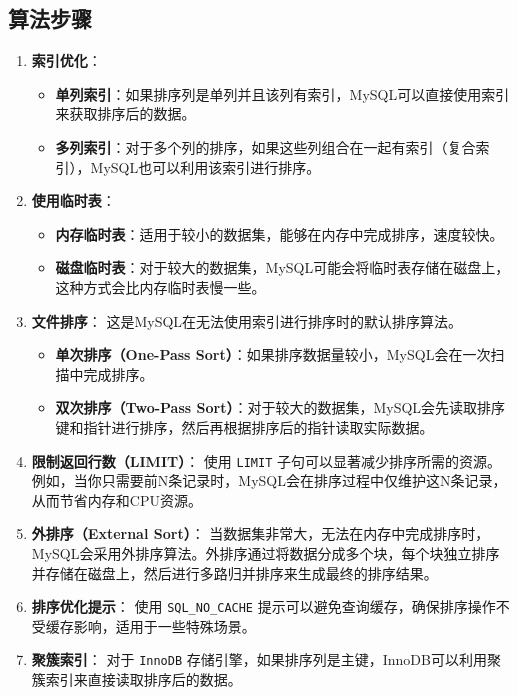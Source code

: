 \documentclass{report}
\begin{document}
\subsection{算法步骤}
\begin{enumerate}
    \item \textbf{索引优化}：
    \begin{itemize}
        \item \textbf{单列索引}：如果排序列是单列并且该列有索引，MySQL可以直接使用索引来获取排序后的数据。
        \item \textbf{多列索引}：对于多个列的排序，如果这些列组合在一起有索引（复合索引），MySQL也可以利用该索引进行排序。
    \end{itemize}
    
    \item \textbf{使用临时表}：
    \begin{itemize}
        \item \textbf{内存临时表}：适用于较小的数据集，能够在内存中完成排序，速度较快。
        \item \textbf{磁盘临时表}：对于较大的数据集，MySQL可能会将临时表存储在磁盘上，这种方式会比内存临时表慢一些。
    \end{itemize}
    
    \item \textbf{文件排序}：
    这是MySQL在无法使用索引进行排序时的默认排序算法。
    \begin{itemize}
        \item \textbf{单次排序（One-Pass Sort）}：如果排序数据量较小，MySQL会在一次扫描中完成排序。
        \item \textbf{双次排序（Two-Pass Sort）}：对于较大的数据集，MySQL会先读取排序键和指针进行排序，然后再根据排序后的指针读取实际数据。
    \end{itemize}
    
    \item \textbf{限制返回行数（LIMIT）}：
    使用 \verb|LIMIT| 子句可以显著减少排序所需的资源。例如，当你只需要前N条记录时，MySQL会在排序过程中仅维护这N条记录，从而节省内存和CPU资源。
    
    \item \textbf{外排序（External Sort）}：
    当数据集非常大，无法在内存中完成排序时，MySQL会采用外排序算法。外排序通过将数据分成多个块，每个块独立排序并存储在磁盘上，然后进行多路归并排序来生成最终的排序结果。
    
    \item \textbf{排序优化提示}：
    使用 \verb|SQL_NO_CACHE| 提示可以避免查询缓存，确保排序操作不受缓存影响，适用于一些特殊场景。
    
    \item \textbf{聚簇索引}：
    对于 \verb|InnoDB| 存储引擎，如果排序列是主键，InnoDB可以利用聚簇索引来直接读取排序后的数据。
\end{enumerate}
\end{document}
